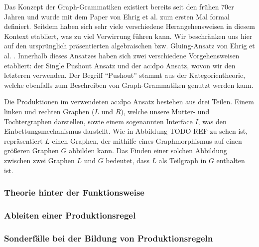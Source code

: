 Das Konzept der Graph-Grammatiken existiert bereits seit den frühen 70er Jahren und wurde mit dem Paper von Ehrig et al. \cite{7_ehrig_et_al}
zum ersten Mal formal definiert. Seitdem haben sich sehr viele verschiedene Herangehensweisen in diesem Kontext etabliert, was zu viel Verwirrung
führen kann. \cite{30_könig_et_al} Wir beschränken uns hier auf den ursprünglich präsentierten algebraischen bzw. Gluing-Ansatz von Ehrig 
et al. \cite{7_ehrig_et_al}. Innerhalb dieses Ansatzes haben sich zwei verschiedene Vorgehensweisen etabliert: der Single Pushout Ansatz und der
\gls{ac:dpo} Ansatz, wovon wir den letzteren verwenden. Der Begriff ``Pushout'' stammt aus der Kategorientheorie, welche ebenfalls zum Beschreiben
von Graph-Grammatiken genutzt werden kann. \cite{1_merrell}

Die Produktionen im verwendeten \gls{ac:dpo} Ansatz bestehen aus drei Teilen. Einem linken und rechten Graphen (\(L\) und \(R\)), welche
unsere Mutter- und Tochtergraphen darstellen, sowie einem sogenannten Interface \(I\), was den Einbettungsmechanismus darstellt. Wie
in Abbildung TODO REF zu sehen ist, repräsentiert \(L\) einen Graphen, der mithilfe eines Graphmorphismus auf einen größeren Graphen \(G\)
abbilden kann. Das Finden einer solchen Abbildung zwischen zwei Graphen \(L\) und \(G\) bedeutet, dass \(L\) als Teilgraph in \(G\) enthalten
ist. %


\subsubsection{Theorie hinter der Funktionsweise}

\subsubsection{Ableiten einer Produktionsregel}

\subsubsection{Sonderfälle bei der Bildung von Produktionsregeln}
